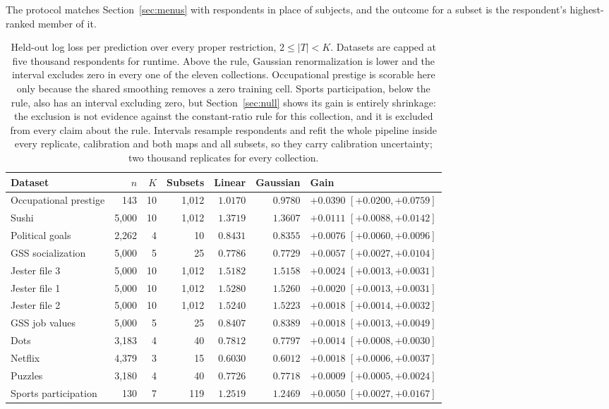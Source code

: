 \documentclass[11pt]{article}
\begin{document}
The protocol matches Section~\ref{sec:menus} with respondents in place of subjects, and
the outcome for a subset is the respondent's highest-ranked member of it.

\begin{table}[ht]
\centering
\small
\begin{tabular}{lrrrrrl}
\toprule
Dataset & $n$ & $K$ & Subsets & Linear & Gaussian & Gain \\
\midrule
Occupational prestige & 143 & 10 & 1{,}012 & $1.0170$ & $0.9780$ & $+0.0390$ $[+0.0200, +0.0759]$ \\
Sushi & 5{,}000 & 10 & 1{,}012 & $1.3719$ & $1.3607$ & $+0.0111$ $[+0.0088, +0.0142]$ \\
Political goals & 2{,}262 & 4 & 10 & $0.8431$ & $0.8355$ & $+0.0076$ $[+0.0060, +0.0096]$ \\
GSS socialization & 5{,}000 & 5 & 25 & $0.7786$ & $0.7729$ & $+0.0057$ $[+0.0027, +0.0104]$ \\
Jester file 3 & 5{,}000 & 10 & 1{,}012 & $1.5182$ & $1.5158$ & $+0.0024$ $[+0.0013, +0.0031]$ \\
Jester file 1 & 5{,}000 & 10 & 1{,}012 & $1.5280$ & $1.5260$ & $+0.0020$ $[+0.0013, +0.0031]$ \\
Jester file 2 & 5{,}000 & 10 & 1{,}012 & $1.5240$ & $1.5223$ & $+0.0018$ $[+0.0014, +0.0032]$ \\
GSS job values & 5{,}000 & 5 & 25 & $0.8407$ & $0.8389$ & $+0.0018$ $[+0.0013, +0.0049]$ \\
Dots & 3{,}183 & 4 & 40 & $0.7812$ & $0.7797$ & $+0.0014$ $[+0.0008, +0.0030]$ \\
Netflix & 4{,}379 & 3 & 15 & $0.6030$ & $0.6012$ & $+0.0018$ $[+0.0006, +0.0037]$ \\
Puzzles & 3{,}180 & 4 & 40 & $0.7726$ & $0.7718$ & $+0.0009$ $[+0.0005, +0.0024]$ \\
\midrule
Sports participation & 130 & 7 & 119 & $1.2519$ & $1.2469$ & $+0.0050$ $[+0.0027, +0.0167]$ \\
\bottomrule
\end{tabular}
\caption{Held-out log loss per prediction over every proper restriction, $2 \le |T| < K$.
Datasets are capped at five thousand respondents for runtime. Above the rule, Gaussian
renormalization is lower and the interval excludes zero in every one of the eleven collections.
Occupational prestige is scorable here only because the shared smoothing removes a zero training
cell. Sports participation, below the rule, also has an interval excluding zero, but
Section~\ref{sec:null} shows its gain is entirely shrinkage: the exclusion is not evidence
against the constant-ratio rule for this collection, and it is excluded from every claim about
the rule. Intervals resample respondents and refit the whole pipeline inside every
replicate, calibration and both maps and all subsets, so they carry calibration uncertainty;
two thousand replicates for every collection.}
\label{tab:heldout}
\end{table}
\end{document}
